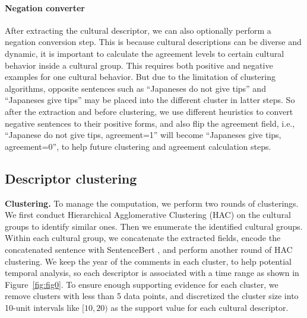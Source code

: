 \documentclass{article} %
\begin{document}
\paragraph{Negation converter} After extracting the cultural descriptor, we can also optionally perform a negation conversion step. This is because cultural descriptions can be diverse and dynamic, it is important to calculate the agreement levels to certain cultural behavior inside a cultural group. This requires both positive and negative examples for one cultural behavior. But due to the limitation of clustering algorithms, opposite sentences such as ``Japaneses do not give tips'' and ``Japaneses give tips'' may be placed into the different cluster in latter steps. So after the extraction and before clustering, we use different heuristics to convert negative sentences to their positive forms, and also flip the agreement field, i.e., ``Japanese do not give tips, agreement=1'' will become ``Japaneses give tips, agreement=0'', to help future clustering and agreement calculation steps. 

\subsection{Descriptor clustering}
\label{appendix:clustering}
\noindent\textbf{Clustering.} To manage the computation, we perform two rounds of clusterings. We first conduct Hierarchical Agglomerative Clustering (HAC) on the cultural groups to identify similar ones. Then we enumerate the identified cultural groups. Within each cultural group, we concatenate the extracted fields, encode the concatenated sentence with SentenceBert \citep{reimers2019sentence}, and perform another round of HAC clustering. %
We keep the year of the comments in each cluster, to help potential temporal analysis, so each descriptor is associated with a time range as shown in Figure~\ref{fig:fig0}. 
To ensure enough supporting evidence for each cluster, we remove clusters with less than 5 data points, and discretized the cluster size into 10-unit intervals like $[10, 20)$ as the support value for each cultural descriptor. %
\end{document}
